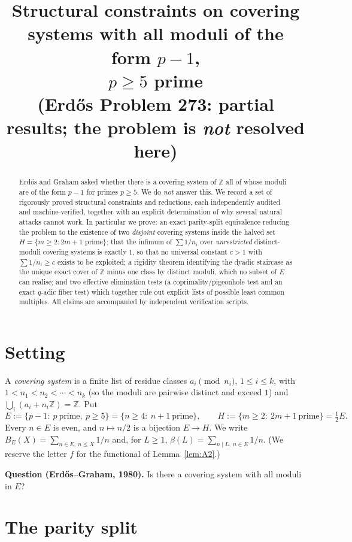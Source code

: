\documentclass[11pt]{article}
\title{Structural constraints on covering systems with all moduli of the form $p-1$,\\
$p\ge5$ prime\\[2mm]
\large (Erd\H{o}s Problem 273: partial results; the problem is \emph{not} resolved here)}
\author{}
\date{}
\theoremstyle{definition}
\begin{document}
\maketitle

\begin{abstract}
Erd\H{o}s and Graham asked whether there is a covering system of $\mathbb Z$ all of whose moduli
are of the form $p-1$ for primes $p\ge5$. We do \emph{not} answer this. We record a set of
rigorously proved structural constraints and reductions, each independently audited and
machine-verified, together with an explicit determination of why several natural attacks cannot
work. In particular we prove: an exact parity-split equivalence reducing the problem to the
existence of two \emph{disjoint} covering systems inside the halved set $H=\{m\ge2:2m+1\text{ prime}\}$;
that the infimum of $\sum 1/n_i$ over \emph{unrestricted} distinct-moduli covering systems is
exactly $1$, so that no universal constant $c>1$ with $\sum 1/n_i\ge c$ exists to be exploited;
a rigidity theorem identifying the dyadic staircase as the unique exact cover of $\mathbb Z$ minus
one class by distinct moduli, which no subset of $E$ can realise; and two effective elimination
tests (a coprimality/pigeonhole test and an exact $q$-adic fiber test) which together rule out
explicit lists of possible least common multiples. All claims are accompanied by independent
verification scripts.
\end{abstract}

\section{Setting}

A \emph{covering system} is a finite list of residue classes $a_i \pmod{n_i}$, $1\le i\le k$, with
$1<n_1<n_2<\cdots<n_k$ (so the moduli are pairwise distinct and exceed $1$) and
$\bigcup_i (a_i+n_i\mathbb Z)=\mathbb Z$. Put
\[
E:=\{p-1:\ p\ \text{prime},\ p\ge5\}=\{n\ge4:\ n+1\ \text{prime}\},\qquad
H:=\{m\ge2:\ 2m+1\ \text{prime}\}=\tfrac12E .
\]
Every $n\in E$ is even, and $n\mapsto n/2$ is a bijection $E\to H$. We write
$B_E(X)=\sum_{n\in E,\ n\le X}1/n$ and, for $L\ge1$, $\beta(L)=\sum_{n\mid L,\ n\in E}1/n$.
(We reserve the letter $f$ for the functional of Lemma~\ref{lem:A2}.)

\smallskip
\noindent\textbf{Question (Erd\H{o}s--Graham, 1980).} Is there a covering system with all moduli in
$E$?

\section{The parity split}
\end{document}
